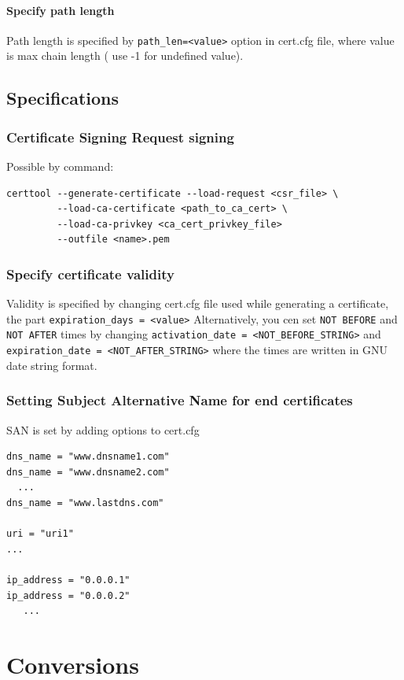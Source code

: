 \documentclass[10pt, a4paper]{report}
\begin{document}
      \paragraph{Specify path length}
Path length is specified by \verb+path_len=<value>+ option in cert.cfg file, where value is max chain length ( use -1 for undefined value).

  \subsection{Specifications}
  
    \subsubsection{Certificate Signing Request signing}
Possible by command:
\begin{verbatim}
certtool --generate-certificate --load-request <csr_file> \
         --load-ca-certificate <path_to_ca_cert> \
         --load-ca-privkey <ca_cert_privkey_file> 
         --outfile <name>.pem
\end{verbatim}

    \subsubsection{Specify certificate validity}
Validity is specified by changing cert.cfg file used while generating a certificate, the part \verb+expiration_days = <value>+
Alternatively, you cen set \verb+NOT BEFORE+ and \verb+NOT AFTER+ times by changing \verb+activation_date = <NOT_BEFORE_STRING>+ and \verb+expiration_date = <NOT_AFTER_STRING>+ where the times are written in GNU date string format.

    \subsubsection{Setting Subject Alternative Name for end certificates}
SAN is set by adding options to cert.cfg
\begin{verbatim}
dns_name = "www.dnsname1.com"
dns_name = "www.dnsname2.com"
  ...
dns_name = "www.lastdns.com"

uri = "uri1"
...

ip_address = "0.0.0.1"
ip_address = "0.0.0.2"
   ...
\end{verbatim}    

\section{Conversions}
\end{document}
